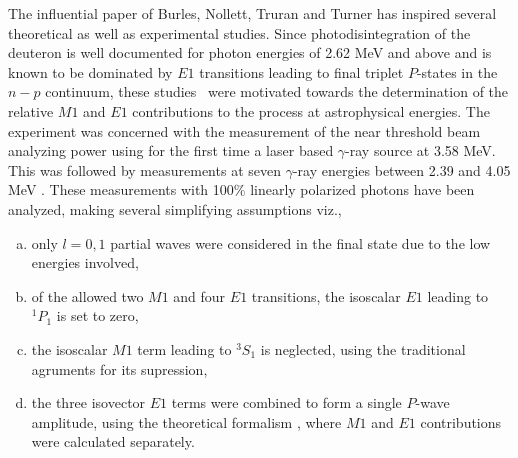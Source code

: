 The influential paper of Burles, Nollett, Truran and Turner \cite{key17} has inspired several theoretical \cite{key42,key43} as well as experimental \cite{key45,key46,key47,key48} studies. Since photodisintegration of the deuteron is well documented \cite{key28} for photon energies of 2.62 MeV and above and is known to be dominated by $E1$ transitions leading to final triplet  $P$-states in the $n-p$ continuum, these studies~\cite{key42,key43,key44,key45,key46} were  motivated towards the determination of the relative $M1$ and $E1$ contributions to the process at astrophysical energies. The experiment \cite{key45} was concerned with the measurement of the near threshold beam analyzing power using for the first time a laser based $\gamma$-ray source at 3.58 MeV. This was followed by measurements at seven $\gamma$-ray energies between 2.39 and 4.05 MeV \cite{key46}. These measurements with 100$\%$ linearly polarized photons have been analyzed, making several  simplifying assumptions viz., 
\begin{enumerate}[a)]
\item only $l=0,1$ partial waves were considered in the final state  due to the low energies involved,
\item of the allowed two $M1$ and four $E1$ transitions, the isoscalar $E1$ leading to $^1P_1$ is set to zero,
\item the isoscalar $M1$ term leading to $^3S_1$ is neglected, using the traditional agruments for its supression,
\item the three isovector $E1$ terms were combined to form a single $P$-wave amplitude, using the theoretical formalism \cite{key49}, where $M1$ and $E1$ contributions were calculated separately.
\end{enumerate}

